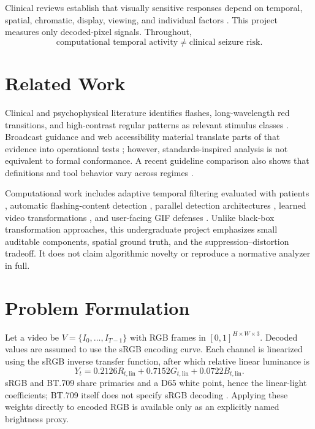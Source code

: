 \documentclass[9pt,twocolumn]{article}
\begin{document}
Clinical reviews establish that visually sensitive responses depend on temporal, spatial, chromatic, display, viewing, and individual factors \cite{fisher2005photic,fisher2022visually,harding2010image}. This project measures only decoded-pixel signals. Throughout,
\[
\text{computational temporal activity}\ne\text{clinical seizure risk}.
\]

\section{Related Work}
Clinical and psychophysical literature identifies flashes, long-wavelength red transitions, and high-contrast regular patterns as relevant stimulus classes \cite{fisher2022visually,wilkins2005patterns,porciatti2000cortical}. Broadcast guidance and web accessibility material translate parts of that evidence into operational tests \cite{itu1702,w3c2023flashes}; however, standards-inspired analysis is not equivalent to formal conformance. A recent guideline comparison also shows that definitions and tool behavior vary across regimes \cite{jordan2024guidelines}.

Computational work includes adaptive temporal filtering evaluated with patients \cite{nomura2000adaptive}, automatic flashing-content detection \cite{carreira2015automatic}, parallel detection architectures \cite{alzubaidi2016parallel}, learned video transformations \cite{barbu2020deep}, and user-facing GIF defenses \cite{south2021gifs}. Unlike black-box transformation approaches, this undergraduate project emphasizes small auditable components, spatial ground truth, and the suppression--distortion tradeoff. It does not claim algorithmic novelty or reproduce a normative analyzer in full.

\section{Problem Formulation}
Let a video be $V=\{I_0,\ldots,I_{T-1}\}$ with RGB frames in $[0,1]^{H\times W\times3}$. Decoded values are assumed to use the sRGB encoding curve. Each channel is linearized using the sRGB inverse transfer function, after which relative linear luminance is
\begin{equation}
Y_t=0.2126R_{t,\mathrm{lin}}+0.7152G_{t,\mathrm{lin}}+0.0722B_{t,\mathrm{lin}}.
\end{equation}
sRGB and BT.709 share primaries and a D65 white point, hence the linear-light coefficients; BT.709 itself does not specify sRGB decoding \cite{itu709,w3c_luminance}. Applying these weights directly to encoded RGB is available only as an explicitly named brightness proxy.
\end{document}
